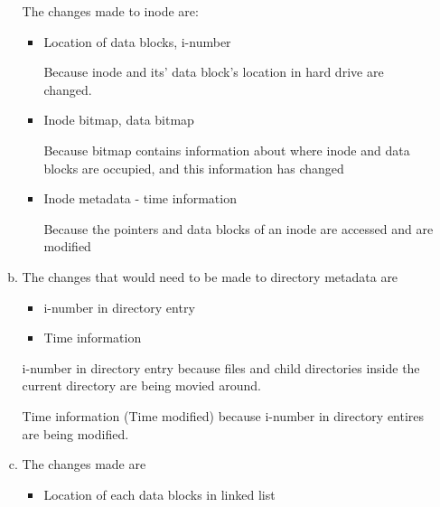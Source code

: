\documentclass[12pt]{article}
\begin{document}
\begin{enumerate}[1.]
\begin{enumerate}[a)]
\begin{mdframed}
        The changes made to inode are:

        \begin{itemize}
            \item Location of data blocks, i-number

            \bigskip

            \color{red}Because inode and its' data block's location in hard drive are changed.\color{black}

            \item \color{red}Inode bitmap, data bitmap\color{black}

            \bigskip

            \color{red}Because bitmap contains information about where inode and data
            blocks are occupied, and this information has changed\color{black}
            \item \color{red}Inode metadata - time information\color{black}

            \bigskip

            \color{red}Because the pointers and data blocks of an inode are accessed and are modified\color{black}
        \end{itemize}

        \end{mdframed}

        \item

        The changes that would need to be made to directory metadata are

        \begin{itemize}
            \item i-number in directory entry
            \item Time information
        \end{itemize}

        i-number in directory entry because files and child directories inside
        the current directory are being movied around.

        \bigskip

        Time information (Time modified) because i-number in directory entires are being modified.

        \item

        The changes made are

        \begin{itemize}
            \item Location of each data blocks in linked list


\end{itemize}
\end{enumerate}
\end{enumerate}
\end{document}
